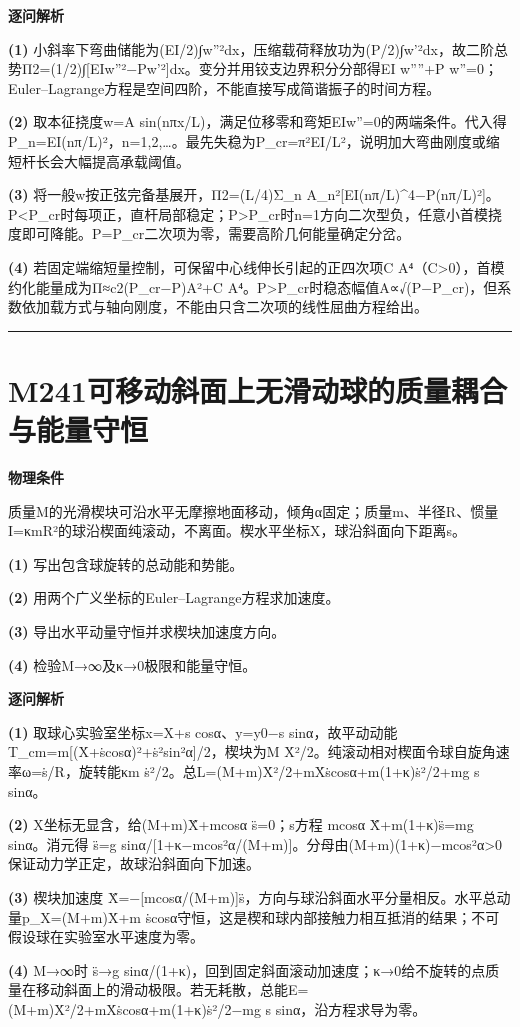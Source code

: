 \documentclass[UTF8,a4paper,11pt,oneside,openany]{ctexbook}
\begin{document}
\par\medskip\noindent\textbf{逐问解析}
\par\noindent\textbf{(1)} 小斜率下弯曲储能为(EI/2)∫w''²dx，压缩载荷释放功为(P/2)∫w'²dx，故二阶总势Π2=(1/2)∫[EIw''²−Pw'²]dx。变分并用铰支边界积分分部得EI w''''+P w''=0；Euler–Lagrange方程是空间四阶，不能直接写成简谐振子的时间方程。
\par\noindent\textbf{(2)} 取本征挠度w=A sin(nπx/L)，满足位移零和弯矩EIw''=0的两端条件。代入得P\_n=EI(nπ/L)²，n=1,2,…。最先失稳为P\_cr=π²EI/L²，说明加大弯曲刚度或缩短杆长会大幅提高承载阈值。
\par\noindent\textbf{(3)} 将一般w按正弦完备基展开，Π2=(L/4)Σ\_n A\_n²[EI(nπ/L)\textasciicircum{}4−P(nπ/L)²]。P<P\_cr时每项正，直杆局部稳定；P>P\_cr时n=1方向二次型负，任意小首模挠度即可降能。P=P\_cr二次项为零，需要高阶几何能量确定分岔。
\par\noindent\textbf{(4)} 若固定端缩短量控制，可保留中心线伸长引起的正四次项C A⁴（C>0），首模约化能量成为Π≈c2(P\_cr−P)A²+C A⁴。P>P\_cr时稳态幅值A∝√(P−P\_cr)，但系数依加载方式与轴向刚度，不能由只含二次项的线性屈曲方程给出。

\par\bigskip\hrule\bigskip
\section*{M241\quad 可移动斜面上无滑动球的质量耦合与能量守恒}
\textbf{物理条件}\par 质量M的光滑楔块可沿水平无摩擦地面移动，倾角α固定；质量m、半径R、惯量I=κmR²的球沿楔面纯滚动，不离面。楔水平坐标X，球沿斜面向下距离s。
\par\noindent\textbf{(1)} 写出包含球旋转的总动能和势能。
\par\noindent\textbf{(2)} 用两个广义坐标的Euler–Lagrange方程求加速度。
\par\noindent\textbf{(3)} 导出水平动量守恒并求楔块加速度方向。
\par\noindent\textbf{(4)} 检验M→∞及κ→0极限和能量守恒。

\par\medskip\noindent\textbf{逐问解析}
\par\noindent\textbf{(1)} 取球心实验室坐标x=X+s cosα、y=y0−s sinα，故平动动能T\_cm=m[(Ẋ+ṡcosα)²+ṡ²sin²α]/2，楔块为M Ẋ²/2。纯滚动相对楔面令球自旋角速率ω=ṡ/R，旋转能κm ṡ²/2。总L=(M+m)Ẋ²/2+mẊṡcosα+m(1+κ)ṡ²/2+mg s sinα。
\par\noindent\textbf{(2)} X坐标无显含，给(M+m)Ẍ+mcosα s̈=0；s方程 mcosα Ẍ+m(1+κ)s̈=mg sinα。消元得 s̈=g sinα/[1+κ−mcos²α/(M+m)]。分母由(M+m)(1+κ)−mcos²α>0保证动力学正定，故球沿斜面向下加速。
\par\noindent\textbf{(3)} 楔块加速度 Ẍ=−[mcosα/(M+m)]s̈，方向与球沿斜面水平分量相反。水平总动量p\_X=(M+m)Ẋ+m ṡcosα守恒，这是楔和球内部接触力相互抵消的结果；不可假设球在实验室水平速度为零。
\par\noindent\textbf{(4)} M→∞时 s̈→g sinα/(1+κ)，回到固定斜面滚动加速度；κ→0给不旋转的点质量在移动斜面上的滑动极限。若无耗散，总能E=(M+m)Ẋ²/2+mẊṡcosα+m(1+κ)ṡ²/2−mg s sinα，沿方程求导为零。
\end{document}
